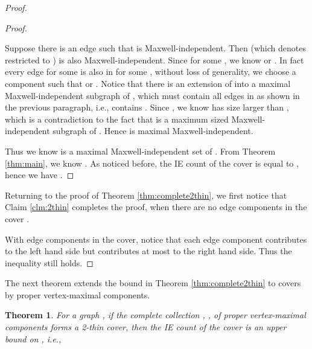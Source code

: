 \documentclass[10pt]{article}
\newtheorem{thm}{Theorem}
\begin{document}
\begin{proof}
\begin{proof}
\begin{enumerate}[(I)]
Suppose there is an edge  such that  is  Maxwell-independent. Then  (which denotes  restricted to ) is also Maxwell-independent. Since  for some , we know  or . In fact every edge  for some  is also in  for some , without loss of generality, we choose a component  such that  or . 
Notice that there is an extension of  into a maximal Maxwell-independent subgraph  of , which must contain all edges in  as shown in the previous paragraph, i.e.,  contains   . Since     , we know  has size larger than , which is a contradiction to the fact that  is a maximum sized Maxwell-independent subgraph of . Hence  is maximal Maxwell-independent.

\end{enumerate}

\medskip\noindent
Thus we know  is a maximal Maxwell-independent set of . From Theorem \ref{thm:main}, we know . As noticed before, the IE count of the cover  is equal to , hence we have
   . 

\end{proof}

Returning to the proof of Theorem \ref{thm:complete2thin}, we first notice that Claim \ref{clm:2thin} completes the proof, when there are no edge components in the cover .

With edge components in the cover, notice that each edge component contributes  to the left hand side but contributes at most  to the right hand side. Thus the inequality still holds.

\end{proof}


The next theorem extends the bound in Theorem \ref{thm:complete2thin} to covers by proper vertex-maximal components.

\begin{thm}\label{thm:properComplete2thin}
For a graph , if the complete collection   , ,  of proper vertex-maximal components forms a 2-thin cover, then the IE count of the cover  is an upper bound on , i.e., 
\end{thm}
\end{document}
